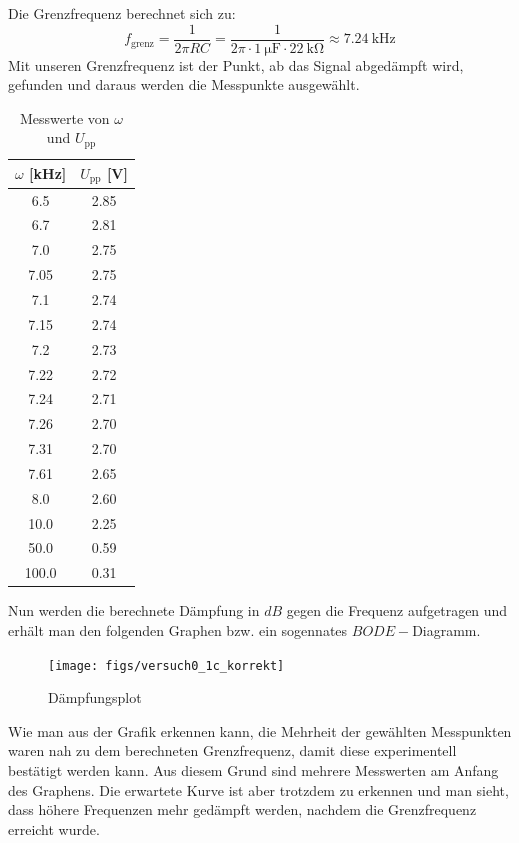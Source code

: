 \documentclass{article}
\begin{document}
\begin{enumerate}[label=\alph*]
         Die Grenzfrequenz berechnet sich zu:
         \[
         f_{\text{grenz}} = \frac{1}{2\pi R C} = \frac{1}{2\pi \cdot \SI{1}{\micro\farad} \cdot \SI{22}{\kilo\ohm}} 
         \approx \SI{7.24}{\kilo\hertz}
         \]
         Mit unseren Grenzfrequenz ist der Punkt, ab das Signal abgedämpft wird, gefunden und daraus 
         werden die Messpunkte ausgewählt. 
         \begin{table}[H]
            \centering
            \begin{tabular}{|c|c|}
            \hline
            $\omega$ [kHz] & $U_{\text{pp}}$ [V] \\
            \hline
            6.5  & 2.85 \\
            6.7  & 2.81 \\
            7.0  & 2.75 \\
            7.05 & 2.75 \\
            7.1  & 2.74 \\
            7.15 & 2.74 \\
            7.2  & 2.73 \\
            7.22 & 2.72 \\
            7.24 & 2.71 \\
            7.26 & 2.70 \\
            7.31 & 2.70 \\
            7.61 & 2.65 \\
            8.0  & 2.60 \\
            10.0 & 2.25 \\
            50.0 & 0.59 \\
            100.0 & 0.31 \\
            \hline
            \end{tabular}
            \caption{Messwerte von $\omega$ und $U_{\text{pp}}$}
            \label{tab:omega_upp}
            \end{table}
            Nun werden die berechnete Dämpfung in $dB$ gegen die Frequenz aufgetragen und erhält man 
            den folgenden Graphen bzw. ein sogennates $BODE-$Diagramm. 

         \begin{figure}[H]
             \centering
             \texttt{[image: figs/versuch0\_1c\_korrekt]}
             \caption{Dämpfungsplot}
             \label{0_1_(c)_Dämpfung}
         \end{figure}

        Wie man aus der Grafik erkennen kann, die Mehrheit der gewählten Messpunkten waren nah zu dem 
         berechneten Grenzfrequenz, damit diese experimentell bestätigt werden kann. Aus diesem Grund sind mehrere Messwerten am Anfang des Graphens. Die erwartete Kurve ist aber trotzdem zu erkennen und man sieht, dass höhere Frequenzen mehr gedämpft werden, nachdem die Grenzfrequenz erreicht wurde.  
         

\end{enumerate}
\end{document}
